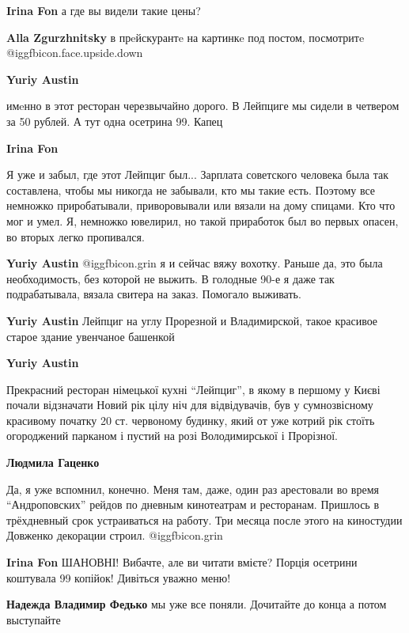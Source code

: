 \begin{itemize}
\begin{itemize}
\begin{itemize}
\textbf{Irina Fon} а где вы видели такие цены?

\textbf{Alla Zgurzhnitsky} в прeйскурантe на картинкe под постом, посмотритe @igg{fbicon.face.upside.down} 

\textbf{Yuriy Austin} 

имeнно в этот ресторан черезвычайно дорого. В Лейпциге мы сидели в четвером за
50 рублей. А тут одна осетрина 99. Капец


\textbf{Irina Fon} 

Я уже и забыл, где этот Лейпциг был... Зарплата советского человека была так
составлена, чтобы мы никогда не забывали, кто мы такие есть. Поэтому все
немножко приробатывали, приворовывали или вязали на дому спицами. Кто что мог и
умел. Я, немножко ювелирил, но такой приработок был во первых опасен, во вторых
легко пропивался.


\textbf{Yuriy Austin}  @igg{fbicon.grin}  я и сейчас вяжу вохотку. Раньше да, это была необходимость, без которой не выжить. В голодные 90-е я даже так подрабатывала, вязала свитера на заказ. Помогало выживать.

\textbf{Yuriy Austin} Лейпциг на углу Прорезной и Владимирской, такое красивое старое здание увенчаное башенкой

\textbf{Yuriy Austin}

Прекрасний ресторан німецької кухні \enquote{Лейпциг}, в якому в першому у Києві почали
відзначати Новий рік цілу ніч для відвідувачів, був у сумнозвісному красивому
початку 20 ст. червоному будинку, який от уже котрий рік стоїть огороджений
парканом і пустий на розі Володимирської і Прорізної.

\textbf{Людмила Гаценко} 

Да, я уже вспомнил, конечно. Меня там, даже, один раз арестовали во время
\enquote{Андроповских} рейдов по дневным кинотеатрам и ресторанам. Пришлось в
трёхдневный срок устраиваться на работу. Три месяца после этого на киностудии
Довженко декорации строил. @igg{fbicon.grin} 

\textbf{Irina Fon} ШАНОВНІ! Вибачте, але ви читати вмієте? Порція осетрини коштувала 99 копійок!
Дивіться уважно меню!

\textbf{Надежда Владимир Федько} мы уже все поняли. Дочитайте до конца а потом выступайте
\end{itemize} %


\end{itemize}
\end{itemize}
